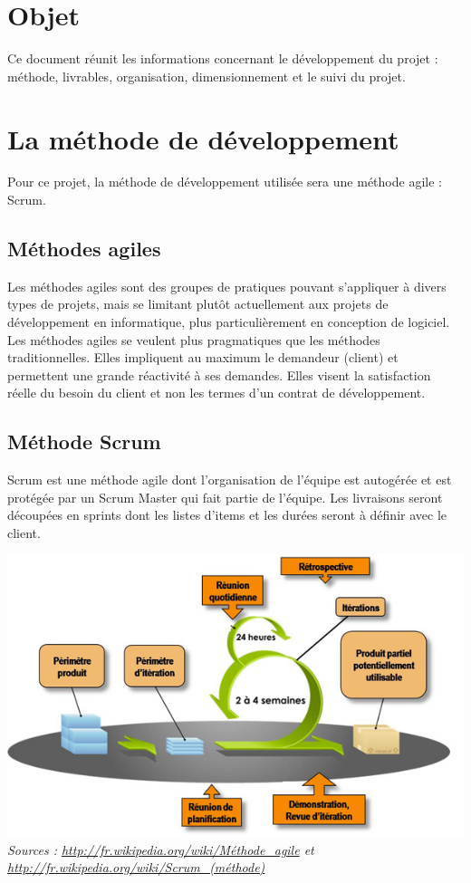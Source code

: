 \documentclass[a4paper,11pt,french]{article}
\begin{document}
\clearpage
\tableofcontents
\clearpage
\section{Objet}
Ce document réunit les informations concernant le développement du projet : méthode, livrables, organisation, dimensionnement et le suivi du projet.


\section{La méthode de développement}
Pour ce projet, la méthode de développement utilisée sera une méthode agile : Scrum.

\subsection{Méthodes agiles} 
Les méthodes agiles sont des groupes de pratiques pouvant s'appliquer à divers types de projets, mais se limitant plutôt actuellement aux projets de développement en informatique, plus particulièrement en conception de logiciel. Les méthodes agiles se veulent plus pragmatiques que les méthodes traditionnelles. Elles impliquent au maximum le demandeur (client) et permettent une grande réactivité à ses demandes. Elles visent la satisfaction réelle du besoin du client et non les termes d'un contrat de développement.

\subsection{Méthode Scrum}
Scrum est une méthode agile dont l'organisation de l'équipe est autogérée et est protégée par un Scrum Master qui fait partie de l'équipe. Les livraisons seront découpées en sprints dont les listes d'items et les durées seront à définir avec le client.

\includegraphics[width=17cm]{scrum-agiles.jpg}
\textit{Sources : \url{http://fr.wikipedia.org/wiki/Méthode_agile} et \url{http://fr.wikipedia.org/wiki/Scrum\_(méthode)}}
\end{document}

